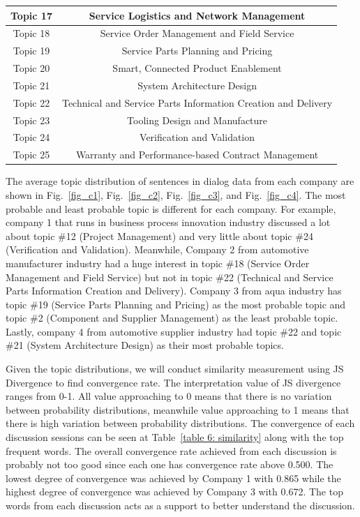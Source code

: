 \documentclass[senior]{IPSstyle}
\begin{document}
\begin{longtable}{|c|c|}
\hline
Topic 17&Service Logistics and Network Management \\
\hline
Topic 18&Service Order Management and Field Service \\
\hline
Topic 19&Service Parts Planning and Pricing \\
\hline
Topic 20&Smart, Connected Product Enablement \\
\hline
Topic 21&System Architecture Design \\
\hline
Topic 22&Technical and Service Parts Information Creation and Delivery\\
\hline
Topic 23&Tooling Design and Manufacture \\
\hline
Topic 24&Verification and Validation \\
\hline
Topic 25&Warranty and Performance-based Contract Management \label{table 5: mapping plm}\\\hline
\end{longtable}

The average topic distribution of sentences in dialog data from each company are shown in Fig.~\ref{fig_c1}, Fig.~\ref{fig_c2}, Fig.~\ref{fig_c3}, and Fig.~\ref{fig_c4}. The most probable and least probable topic is different for each company. For example, company 1 that runs in business process innovation industry discussed a lot about topic \#12 (Project Management) and very little about topic \#24 (Verification and Validation). Meanwhile, Company 2 from automotive manufacturer industry had a huge interest in topic \#18 (Service Order Management and Field Service) but not in topic \#22 (Technical and Service Parts Information Creation and Delivery). Company 3 from aqua industry has topic \#19 (Service Parts Planning and Pricing) as the most probable topic and topic \#2 (Component and Supplier Management) as the least probable topic. Lastly, company 4 from automotive supplier industry had topic \#22 and topic \#21 (System Architecture Design) as their most probable topics.

Given the topic distributions, we will conduct similarity measurement using JS Divergence to find convergence rate. The interpretation value of JS divergence ranges from 0-1. All value approaching to 0 means that there is no variation between probability distributions, meanwhile value approaching to 1 means that there is high variation between probability distributions. The convergence of each discussion sessions can be seen at Table~\ref{table 6: similarity} along with the top frequent words. The overall convergence rate achieved from each discussion is probably not too good since each one has convergence rate above 0.500. The lowest degree of convergence was achieved by Company 1 with 0.865 while the highest degree of convergence was achieved by Company 3 with 0.672. The top words from each discussion acts as a support to better understand the discussion.
\end{document}
